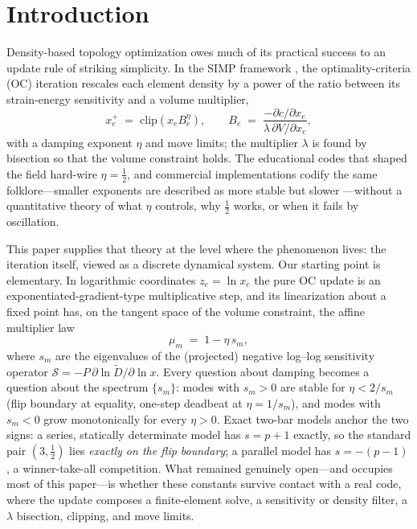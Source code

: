 \documentclass[11pt,a4paper]{article}
\newcommand{\Dfilt}{\tilde{D}}
\begin{document}
\section{Introduction}\label{sec:intro}

Density-based topology optimization owes much of its practical success to an
update rule of striking simplicity. In the SIMP framework
\citep{bendsoe1989}, the optimality-criteria (OC) iteration rescales each
element density by a power of the ratio between its strain-energy sensitivity
and a volume multiplier,
\begin{equation}
  x_e^{+} \;=\; \mathrm{clip}\!\left( x_e B_e^{\eta} \right),
  \qquad
  B_e \;=\; \frac{-\partial c/\partial x_e}{\lambda\,\partial V/\partial x_e},
  \label{eq:oc}
\end{equation}
with a damping exponent $\eta$ and move limits; the multiplier $\lambda$ is
found by bisection so that the volume constraint holds. The educational
codes that shaped the field \citep{sigmund2001top99,andreassen2011top88}
hard-wire $\eta=\tfrac12$, and commercial implementations codify the same
folklore---smaller exponents are described as more stable but slower
\citep{abaqus_stressratio}---without a quantitative theory of what $\eta$
controls, why $\tfrac12$ works, or when it fails by oscillation.

This paper supplies that theory at the level where the phenomenon lives: the
iteration itself, viewed as a discrete dynamical system. Our starting point
is elementary. In logarithmic coordinates $z_e=\ln x_e$ the pure OC update
is an exponentiated-gradient-type multiplicative step, and its linearization
about a fixed point has, on the tangent space of the volume constraint, the
affine multiplier law
\begin{equation}
  \mu_m \;=\; 1-\eta\, s_m ,
  \label{eq:law}
\end{equation}
where $s_m$ are the eigenvalues of the (projected) negative log--log
sensitivity operator $\mathcal S = -P\,\partial \ln \Dfilt / \partial \ln x$.
Every question about damping becomes a question about the spectrum
$\{s_m\}$: modes with $s_m>0$ are stable for $\eta<2/s_m$ (flip boundary at
equality, one-step deadbeat at $\eta=1/s_m$), and modes with $s_m<0$ grow
monotonically for every $\eta>0$. Exact two-bar models anchor the two signs:
a series, statically determinate model has $s=p{+}1$ exactly, so the
standard pair $(3,\tfrac12)$ lies \emph{exactly on the flip boundary}; a
parallel model has $s=-(p{-}1)$, a winner-take-all competition. What
remained genuinely open---and occupies most of this paper---is whether these
constants survive contact with a real code, where the update composes a
finite-element solve, a sensitivity or density filter, a $\lambda$
bisection, clipping, and move limits.
\end{document}
